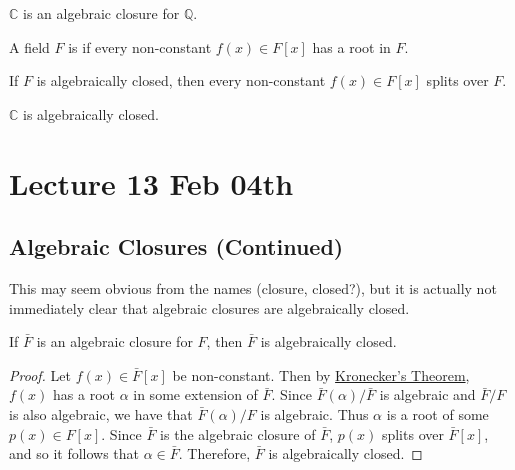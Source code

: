\documentclass[notoc,notitlepage]{tufte-book}
\begin{document}
\begin{eg}
  $\mathbb{C}$ is  an algebraic closure for $\mathbb{Q}$.
\end{eg}

\begin{defn}\label{defn:algebraically_closed}
  A field $F$ is  if every non-constant $f(x) \in F[x]$
  has a root in $F$.
\end{defn}

\begin{remark}
  If $F$ is algebraically closed, then every non-constant $f(x) \in F[x]$ splits over $F$.
\end{remark}

\begin{eg}
  $\mathbb{C}$ is algebraically closed.
\end{eg}



\chapter{Lecture 13 Feb 04th}%
\label{chp:lecture_13_feb_04th}

\section{Algebraic Closures (Continued)}%
\label{sec:algebraic_closures_continued}

This may seem obvious from the names (closure, closed?), but it is actually not
immediately clear that algebraic closures are algebraically closed.

\begin{propo}\label{propo:algebraic_closures_are_algebraically_closed}
  If $\bar{F}$ is an algebraic closure for $F$, then $\bar{F}$ is algebraically closed.
\end{propo}

\begin{proof}
  Let $f(x) \in \bar{F}[x]$ be non-constant. Then by
  \hyperref[thm:kronecker_s_theorem]{Kronecker's Theorem}, $f(x)$ has a root $\alpha$ in
  some extension of $\bar{F}$. Since $\bar{F}(\alpha) / \bar{F}$ is algebraic and $\bar{F}
  / F$ is also algebraic, we have that $\bar{F}(\alpha) / F$ is algebraic. Thus $\alpha$
  is a root of some $p(x) \in F[x]$. Since $\bar{F}$ is the algebraic closure of
  $\bar{F}$, $p(x)$ splits over $\bar{F}[x]$, and so it follows that $\alpha \in \bar{F}$.
  Therefore, $\bar{F}$ is algebraically closed.
\end{proof}
\end{document}
